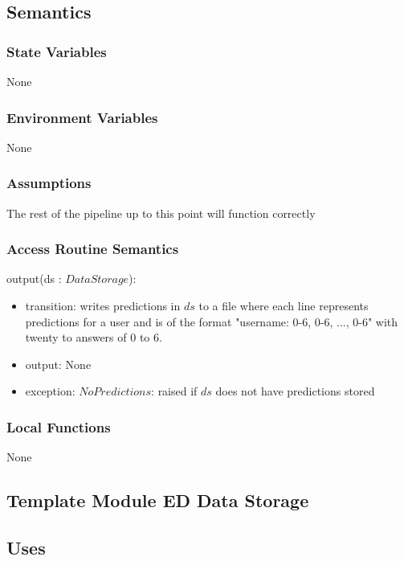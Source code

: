 \documentclass[12pt, titlepage]{article}
\begin{document}
\subsection{Semantics}

\subsubsection{State Variables}

None

\subsubsection{Environment Variables}

None

\subsubsection{Assumptions}

The rest of the pipeline up to this point will function correctly

\subsubsection{Access Routine Semantics}

\noindent output(ds : $DataStorage$):
\begin{itemize}
\item transition: writes predictions in $ds$ to a file where each line represents predictions for a user and is of the format "username: 0-6, 0-6, ..., 0-6" with twenty to answers of 0 to 6.
\item output: None
\item exception: $NoPredictions$: raised if $ds$ does not have predictions stored
\end{itemize}

\subsubsection{Local Functions}

None



\subsection{Template Module ED Data Storage}

\subsection{Uses}
\end{document}
